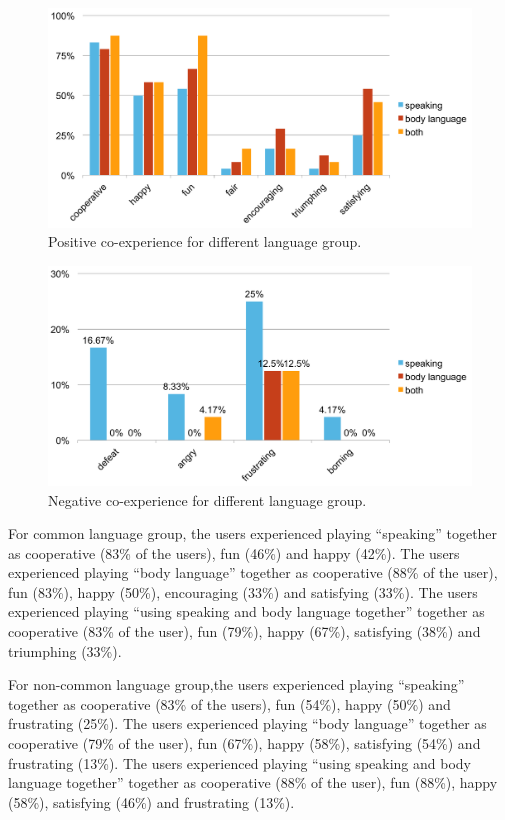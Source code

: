 \begin{figure}[!h]
\centering
\includegraphics[width=0.9\columnwidth]{Figures/US_Co-ex_Dif_Pos.pdf}
\caption{Positive co-experience for different language group.}
\label{fig:US_Co-ex_Dif_Pos}
\end{figure}

\begin{figure}[!h]
\centering
\includegraphics[width=0.9\columnwidth]{Figures/US_Co-ex_Dif_Neg.pdf}
\caption{Negative co-experience for different language group.}
\label{fig:US_Co-ex_Dif_Neg}
\end{figure}


For common language group, the users experienced playing ``speaking'' together as cooperative (83\% of the users), fun (46\%) and happy (42\%). The users experienced playing ``body language'' together as cooperative (88\% of the user), fun (83\%), happy (50\%), encouraging (33\%) and satisfying (33\%). The users experienced playing ``using speaking and body language together'' together as cooperative (83\% of the user), fun (79\%), happy (67\%), satisfying (38\%) and triumphing (33\%).

For non-common language group,the users experienced playing ``speaking'' together as cooperative (83\% of the users), fun (54\%), happy (50\%) and frustrating (25\%). The users experienced playing ``body language'' together as cooperative (79\% of the user), fun (67\%), happy (58\%), satisfying (54\%) and frustrating (13\%). The users experienced playing ``using speaking and body language together'' together as cooperative (88\% of the user), fun (88\%), happy (58\%), satisfying (46\%) and frustrating (13\%). 

